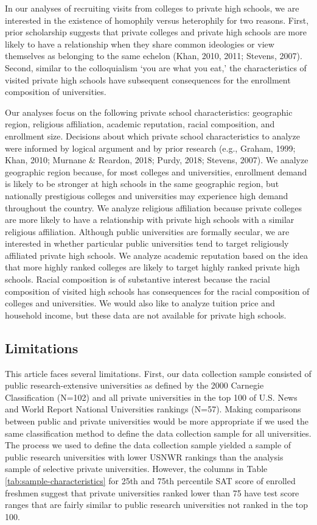 \documentclass[
  12pt,
]{article}
\begin{document}
In our analyses of recruiting visits from colleges to private high schools, we are interested in the existence of homophily versus heterophily for two reasons. First, prior scholarship suggests that private colleges and private high schools are more likely to have a relationship when they share common ideologies or view themselves as belonging to the same echelon (Khan, 2010, 2011; Stevens, 2007). Second, similar to the colloquialism `you are what you eat,' the characteristics of visited private high schools have subsequent consequences for the enrollment composition of universities.

Our analyses focus on the following private school characteristics: geographic region, religious affiliation, academic reputation, racial composition, and enrollment size. Decisions about which private school characteristics to analyze were informed by logical argument and by prior research (e.g., Graham, 1999; Khan, 2010; Murnane \& Reardon, 2018; Purdy, 2018; Stevens, 2007). We analyze geographic region because, for most colleges and universities, enrollment demand is likely to be stronger at high schools in the same geographic region, but nationally prestigious colleges and universities may experience high demand throughout the country. We analyze religious affiliation because private colleges are more likely to have a relationship with private high schools with a similar religious affiliation. Although public universities are formally secular, we are interested in whether particular public universities tend to target religiously affiliated private high schools. We analyze academic reputation based on the idea that more highly ranked colleges are likely to target highly ranked private high schools. Racial composition is of substantive interest because the racial composition of visited high schools has consequences for the racial composition of colleges and universities. We would also like to analyze tuition price and household income, but these data are not available for private high schools.

\hypertarget{limitations}{%
\subsection{Limitations}\label{limitations}}

This article faces several limitations. First, our data collection sample consisted of public research-extensive universities as defined by the 2000 Carnegie Classification (N=102) and all private universities in the top 100 of U.S. News and World Report National Universities rankings (N=57). Making comparisons between public and private universities would be more appropriate if we used the same classification method to define the data collection sample for all universities. The process we used to define the data collection sample yielded a sample of public research universities with lower USNWR rankings than the analysis sample of selective private universities. However, the columns in Table \ref{tab:sample-characteristics} for 25th and 75th percentile SAT score of enrolled freshmen suggest that private universities ranked lower than 75 have test score ranges that are fairly similar to public research universities not ranked in the top 100.
\end{document}
